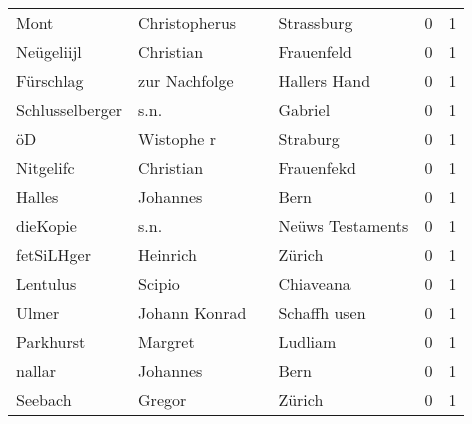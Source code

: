 \begin{tabular}{llllrr}
                     Mont &                      Christopherus &             &                                  Strassburg &          0 &         1 \\
               Neügeliijl &                          Christian &             &                                  Frauenfeld &          0 &         1 \\
                Fürschlag &                      zur Nachfolge &             &                                Hallers Hand &          0 &         1 \\
          Schlusselberger &                               s.n. &             &                                     Gabriel &          0 &         1 \\
                       öD &                         Wistophe r &             &                                    Straburg &          0 &         1 \\
                Nitgelifc &                          Christian &             &                                  Frauenfekd &          0 &         1 \\
                   Halles &                           Johannes &             &                                        Bern &          0 &         1 \\
                 dieKopie &                               s.n. &             &                            Neüws Testaments &          0 &         1 \\
               fetSiLHger &                           Heinrich &             &                                      Zürich &          0 &         1 \\
                 Lentulus &                             Scipio &             &                                   Chiaveana &          0 &         1 \\
                    Ulmer &                      Johann Konrad &             &                                Schaffh usen &          0 &         1 \\
                Parkhurst &                            Margret &             &                                     Ludliam &          0 &         1 \\
                   nallar &                           Johannes &             &                                        Bern &          0 &         1 \\
                  Seebach &                             Gregor &             &                                      Zürich &          0 &         1 \\

\end{tabular}
